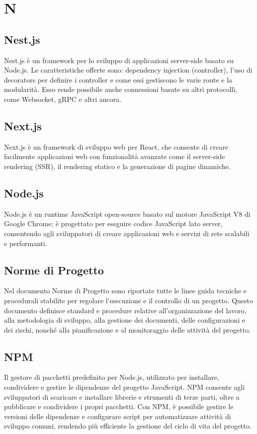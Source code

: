 \section*{N} 
\subsection*{Nest.js} 
Nest.js è un framework per lo sviluppo di applicazioni server-side basato su Node.js. Le caratteristiche offerte sono: dependency injection (controller), l'uso di decorators per definire i controller e come essi gestiscono le varie route e la modularità. Esso rende possibile anche connessioni basate su altri protocolli, come Websocket, gRPC e altri ancora.
\subsection*{Next.js} 
Next.js è un framework di sviluppo web per React, che consente di creare facilmente applicazioni web con funzionalità avanzate come il server-side rendering (SSR), il rendering statico e la generazione di pagine dinamiche.
\subsection*{Node.js} 
Node.js è un runtime JavaScript open-source basato sul motore JavaScript V8 di Google Chrome; è progettato per eseguire codice JavaScript lato server, consentendo agli sviluppatori di creare applicazioni web e servizi di rete scalabili e performanti.
\subsection*{Norme di Progetto} 
Nel documento Norme di Progetto sono riportate tutte le linee guida tecniche e procedurali stabilite per regolare l'esecuzione e il controllo di un progetto. Questo documento definisce standard e procedure relative all'organizzazione del lavoro, alla metodologia di sviluppo, alla gestione dei documenti, delle configurazioni e dei rischi, nonché alla pianificazione e al monitoraggio delle attività del progetto.
\subsection*{NPM} 
Il gestore di pacchetti predefinito per Node.js, utilizzato per installare, condividere e gestire le dipendenze del progetto JavaScript. NPM consente agli sviluppatori di scaricare e installare librerie e strumenti di terze parti, oltre a pubblicare e condividere i propri pacchetti. Con NPM, è possibile gestire le versioni delle dipendenze e configurare script per automatizzare attività di sviluppo comuni, rendendo più efficiente la gestione del ciclo di vita del progetto.
